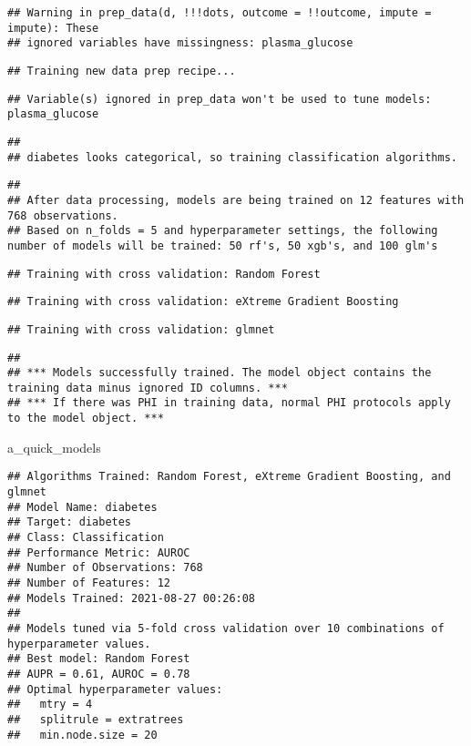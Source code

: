 \documentclass[
]{article}
\newenvironment{Shaded}{\begin{snugshade}}{\end{snugshade}}
\newcommand{\NormalTok}[1]{#1}
\begin{document}
\begin{verbatim}
## Warning in prep_data(d, !!!dots, outcome = !!outcome, impute = impute): These
## ignored variables have missingness: plasma_glucose
\end{verbatim}

\begin{verbatim}
## Training new data prep recipe...
\end{verbatim}

\begin{verbatim}
## Variable(s) ignored in prep_data won't be used to tune models: plasma_glucose
\end{verbatim}

\begin{verbatim}
## 
## diabetes looks categorical, so training classification algorithms.
\end{verbatim}

\begin{verbatim}
## 
## After data processing, models are being trained on 12 features with 768 observations.
## Based on n_folds = 5 and hyperparameter settings, the following number of models will be trained: 50 rf's, 50 xgb's, and 100 glm's
\end{verbatim}

\begin{verbatim}
## Training with cross validation: Random Forest
\end{verbatim}

\begin{verbatim}
## Training with cross validation: eXtreme Gradient Boosting
\end{verbatim}

\begin{verbatim}
## Training with cross validation: glmnet
\end{verbatim}

\begin{verbatim}
## 
## *** Models successfully trained. The model object contains the training data minus ignored ID columns. ***
## *** If there was PHI in training data, normal PHI protocols apply to the model object. ***
\end{verbatim}

\begin{Shaded}
\begin{Highlighting}[]
\NormalTok{a\_quick\_models}
\end{Highlighting}
\end{Shaded}

\begin{verbatim}
## Algorithms Trained: Random Forest, eXtreme Gradient Boosting, and glmnet
## Model Name: diabetes
## Target: diabetes
## Class: Classification
## Performance Metric: AUROC
## Number of Observations: 768
## Number of Features: 12
## Models Trained: 2021-08-27 00:26:08 
## 
## Models tuned via 5-fold cross validation over 10 combinations of hyperparameter values.
## Best model: Random Forest
## AUPR = 0.61, AUROC = 0.78
## Optimal hyperparameter values:
##   mtry = 4
##   splitrule = extratrees
##   min.node.size = 20
\end{verbatim}
\end{document}
